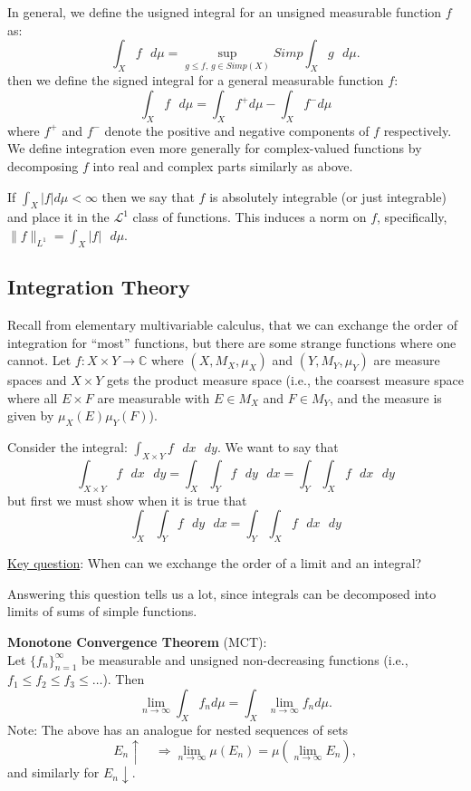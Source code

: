 \documentclass[12pt]{article}
\begin{document}
In general, we define the usigned integral for an unsigned measurable function 
$f$ as:
$$
\int_X f\text{ }d\mu = \sup_{g \leq f\text{, }g \in Simp(X)} 
Simp \int_X g\text{ }d\mu.
$$
then we define the signed integral for a general measurable function $f$:
$$
\int_X f\text{ }d\mu = \int_X f^+ d\mu - \int_X f^- d\mu
$$
where $f^+$ and $f^-$ denote the positive and negative components of $f$
respectively.
We define integration even more generally for complex-valued functions by 
decomposing $f$ into real and complex parts similarly as above.

If $\int_X |f| d\mu < \infty$ then we say that $f$ is absolutely integrable
(or just integrable) and place it in the $\mathcal{L}^1$ class of functions.
This induces a norm on $f$, specifically, 
$\| f \|_{L^1} = \int_X |f|\text{ }d\mu$.

\subsection*{Integration Theory}

Recall from elementary multivariable calculus, that we can exchange the order
of integration for ``most'' functions, but there are some strange functions
where one cannot.
Let $f : X \times Y \rightarrow \mathbb{C}$ where $(X, M_X, \mu_X)$ and 
$(Y, M_Y, \mu_Y)$ are measure spaces and $X \times Y$ gets the product measure 
space (i.e., the coarsest measure space where all $E \times F$ are measurable 
with $E\in M_X$ and $F \in M_Y$, and the measure is given by 
$\mu_X(E)\mu_Y(F)$).

Consider the integral:
$\int_{X\times Y} f \text{ }dx\text{ }dy.$
We want to say that
$$
\int_{X\times Y} f \text{ }dx\text{ }dy
=\int_X \int_Y f\text{ }dy\text{ }dx
=\int_Y \int_X f\text{ }dx\text{ }dy 
$$
but first we must show when it is true that 
$$
\int_X \int_Y f\text{ }dy\text{ }dx
=\int_Y \int_X f\text{ }dx\text{ }dy 
$$

\underline{Key question}: When can we exchange the order of a limit and an 
integral?

Answering this question tells us a lot, since integrals can be decomposed into
limits of sums of simple functions.

\textbf{Monotone Convergence Theorem} (MCT):\\
Let $\{f_n\}_{n=1}^\infty$ be measurable and unsigned non-decreasing functions
(i.e., $f_1 \leq f_2 \leq f_3 \leq \ldots$).
Then 
$$
\lim_{n\rightarrow\infty} \int_X f_n d\mu 
= \int_X \lim_{n\rightarrow\infty} f_n d\mu.
$$
Note: The above has an analogue for nested sequences of sets 
$$ E_n \uparrow \quad \Rightarrow 
\lim_{n\rightarrow\infty}\mu(E_n) = \mu(\lim_{n\rightarrow\infty} E_n),$$ 
and similarly for $E_n \downarrow$.
\end{document}
